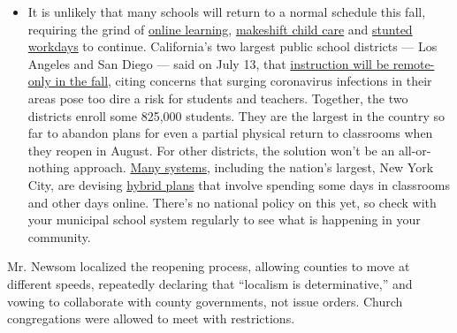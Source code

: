 \begin{itemize}
  \begin{itemize}
  \tightlist
  \item
    It is unlikely that many schools will return to a normal schedule
    this fall, requiring the grind of
    \href{https://www.nytimes3xbfgragh.onion/2020/06/05/us/coronavirus-education-lost-learning.html?action=click\&pgtype=Article\&state=default\&region=MAIN_CONTENT_3\&context=storylines_faq}{online
    learning},
    \href{https://www.nytimes3xbfgragh.onion/2020/05/29/us/coronavirus-child-care-centers.html?action=click\&pgtype=Article\&state=default\&region=MAIN_CONTENT_3\&context=storylines_faq}{makeshift
    child care} and
    \href{https://www.nytimes3xbfgragh.onion/2020/06/03/business/economy/coronavirus-working-women.html?action=click\&pgtype=Article\&state=default\&region=MAIN_CONTENT_3\&context=storylines_faq}{stunted
    workdays} to continue. California's two largest public school
    districts --- Los Angeles and San Diego --- said on July 13, that
    \href{https://www.nytimes3xbfgragh.onion/2020/07/13/us/lausd-san-diego-school-reopening.html?action=click\&pgtype=Article\&state=default\&region=MAIN_CONTENT_3\&context=storylines_faq}{instruction
    will be remote-only in the fall}, citing concerns that surging
    coronavirus infections in their areas pose too dire a risk for
    students and teachers. Together, the two districts enroll some
    825,000 students. They are the largest in the country so far to
    abandon plans for even a partial physical return to classrooms when
    they reopen in August. For other districts, the solution won't be an
    all-or-nothing approach.
    \href{https://bioethics.jhu.edu/research-and-outreach/projects/eschool-initiative/school-policy-tracker/}{Many
    systems}, including the nation's largest, New York City, are
    devising
    \href{https://www.nytimes3xbfgragh.onion/2020/06/26/us/coronavirus-schools-reopen-fall.html?action=click\&pgtype=Article\&state=default\&region=MAIN_CONTENT_3\&context=storylines_faq}{hybrid
    plans} that involve spending some days in classrooms and other days
    online. There's no national policy on this yet, so check with your
    municipal school system regularly to see what is happening in your
    community.
  \end{itemize}
\end{itemize}

Mr. Newsom localized the reopening process, allowing counties to move at
different speeds, repeatedly declaring that ``localism is
determinative,'' and vowing to collaborate with county governments, not
issue orders. Church congregations were allowed to meet with
restrictions.

